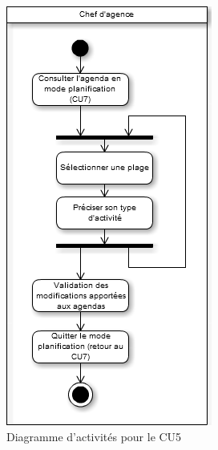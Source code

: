 \begin{figure}[H]
	\begin{center}
		\includegraphics[scale=0.4]{Includes/SOA-Activite-CU5.png}
		\caption{Diagramme d'activités pour le CU5}
	\end{center}
\end{figure}

